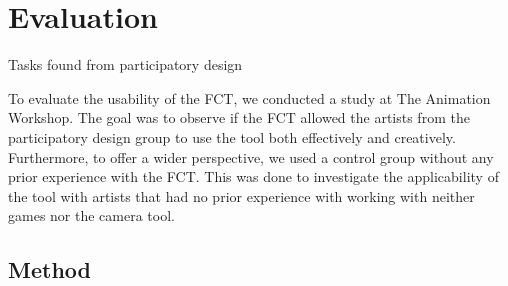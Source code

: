 \section{Evaluation}



Tasks found from participatory design



To evaluate the usability of the FCT, we conducted a study at The Animation Workshop. The goal was to observe if the FCT allowed the artists from the participatory design group to use the tool both effectively and creatively. Furthermore, to offer a wider perspective, we used a control group without any prior experience with the FCT. This was done to investigate the applicability of the tool with artists that had no prior experience with working with neither games nor the camera tool.


\subsection{Method} \label{method}







